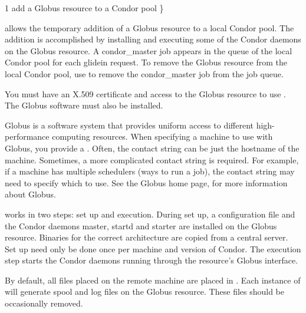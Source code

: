 \begin{ManPage}{\label{man-condor-glidein}}{1}
{add a Globus resource to a Condor pool}
\Synopsis {}
 \} \Bar {}


\Description

 allows the temporary addition of a Globus resource to
a local Condor pool.
The addition is accomplished by installing and executing some of the Condor
daemons on the Globus resource.
A condor\_master job appears in the queue of the local
Condor pool for each glidein request.
To remove the Globus resource from the local Condor pool,
use  to remove the condor\_master job from
the job queue.

You must have an X.509 certificate and access
to the Globus resource to use .
The Globus software must also be installed.

Globus is a software system that provides uniform access to
different high-performance computing resources.
When specifying a machine to use with Globus,
you provide a .
Often, the contact string can be just the hostname of the machine.
Sometimes, a more complicated contact string is required.
For example, if a machine has multiple schedulers (ways to run a job),
the contact string may need to specify which to use.
See the Globus home page,  for more
information about Globus.

 works in two steps: set up and execution.
During set up, a configuration file and the Condor daemons
master, startd and starter are installed on the Globus
resource.
Binaries for the correct architecture are copied from a central server.
Set up need only be done once per machine and version of Condor.
The execution step starts the Condor daemons running through
the resource's Globus interface.

By default, all files placed on the remote machine are placed in
.
Each instance of  will generate spool and log
files on the Globus resource.
These files should be occasionally removed.


\end{ManPage}
